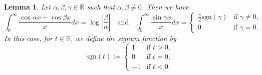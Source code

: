\documentclass[12pt, reqno]{amsart}
\theoremstyle{plain}
\newtheorem{lemma}[theorem]{Lemma}
\theoremstyle{definition}
\begin{document}

\begin{lemma}\cite{II}\label{basic1}
    Let $\alpha, \beta, \gamma\in\mathbb{R}$ such that  $\alpha, \beta\ne 0$. Then we have
    \[\int_0^{\infty}\frac{\cos\alpha x-\cos\beta x}{x}dx=\log\left|\frac{\beta}{\alpha}\right|\quad\text{and}\quad\int_0^{\infty}\frac{\sin \gamma x}{x}dx=\begin{cases}
        \displaystyle\frac{\pi}{2}\text{sgn}(\gamma) &\text{if } \gamma\ne 0,\\
        0 &\text{if } \gamma=0.\end{cases}\]
        In this case, for  $t\in\mathbb{R}$, we define the signum function by
    \[\text{sgn}(t):=\begin{cases}
        1 &\text{if } t>0,\\
        0 &\text{if } t=0,\\
        -1 &\text{if } t<0.
    \end{cases}\]
\end{lemma}

\end{document}

